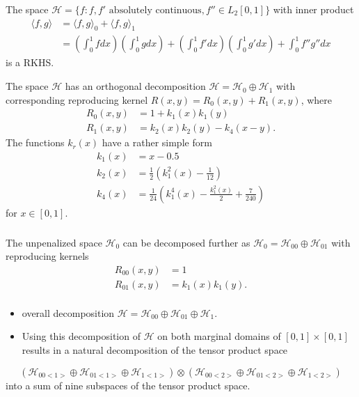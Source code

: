 \documentclass{beamer}
\renewcommand{\H}{\mathcal{H}}
\newcommand{\tsum}{\ensuremath{\oplus}}
\newcommand{\tprod}{\ensuremath{\otimes}}
\newcommand{\inner}[2]{\langle #1, #2 \rangle}
\begin{document}
\begin{frame}
  The space $\H =  \{f : f, f' \mbox{ absolutely continuous}, f'' \in L_2[0,1]\}$ with inner product
  \begin{align*}
  \inner{f}{g} &= \inner{f}{g}_0 + \inner{f}{g}_1 \\
  			&= \left(\int_0^1fdx\right)\left(\int_0^1gdx\right) + \left(\int_0^1f'dx\right)\left(\int_0^1g'dx\right) + \int_0^1 f''g''dx
  \end{align*}
  is a RKHS.
\end{frame}

\begin{frame}
The space $\H$ has an orthogonal decomposition $\H = \H_0 \tsum \H_1$ with corresponding reproducing kernel $R(x,y) = R_0(x,y) + R_1(x,y)$, where
  \begin{align*}
  R_0(x,y) &= 1 + k_1(x)k_1(y) \\
  R_1(x,y) &= k_2(x)k_2(y) - k_4(x-y).
  \end{align*}
  The functions  $k_r(x)$ have a rather simple form
  \begin{align*}
  k_1(x) &= x - 0.5\\
  k_2(x) &= \frac{1}{2}(k_1^2(x) - \frac{1}{12}) \\
  k_4(x) &= \frac{1}{24} \left(k_1^4(x) - \frac{k_1^2(x)}{2} + \frac{7}{240} \right)
  \end{align*}
  for $x \in [0,1]$. 
\end{frame}

\begin{frame}
\frametitle{}
The unpenalized space $\H_0$ can be decomposed further as $\H_0 = \H_{00} \tsum \H_{01}$ with reproducing kernels
  \begin{align*}
  R_{00}(x,y) &= 1\\
   R_{01}(x,y) &= k_1(x)k_1(y).\\
  \end{align*} 
\begin{itemize}
\item overall decomposition $\H= \H_{00} \tsum \H_{01} \tsum \H_1$. 
\item Using this decomposition of $\H$ on both marginal domains of $[0,1] \times [0,1]$ results in a natural decomposition of the tensor product space 
\end{itemize}
\[
 (\H_{00<1>} \tsum \H_{01<1>} \tsum \H_{1<1>})\tprod (\H_{00<2>} \tsum \H_{01<2>} \tsum \H_{1<2>})
\]
into a sum of nine subspaces of the tensor product space.
\end{frame}
\end{document}
